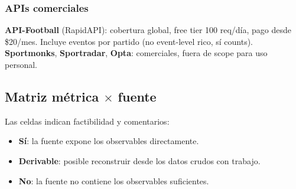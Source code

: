 \subsubsection{APIs comerciales}

\textbf{API-Football} (RapidAPI): cobertura global, free tier 100 req/día, pago desde \$20/mes. Incluye eventos por partido (no event-level rico, sí counts).\\
\textbf{Sportmonks}, \textbf{Sportradar}, \textbf{Opta}: comerciales, fuera de scope para uso personal.

\subsection{Matriz métrica $\times$ fuente}

Las celdas indican factibilidad y comentarios:

\begin{itemize}[noitemsep]
  \item \textbf{Sí}: la fuente expone los observables directamente.
  \item \textbf{Derivable}: posible reconstruir desde los datos crudos con trabajo.
  \item \textbf{No}: la fuente no contiene los observables suficientes.
\end{itemize}

